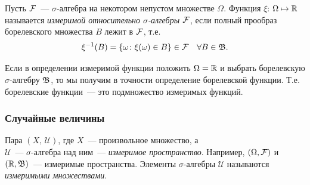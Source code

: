 \begin{defn}
    Пусть $\mathcal{F}$~--- $\sigma$-алгебра на некотором непустом множестве $\Omega$.
    Функция $\xi$: $\Omega \mapsto \mathbb{R}$ называется \textit{измеримой относительно $\sigma$-алгебры $\mathcal{F}$}, если полный прообраз борелевского множества $B$ лежит в $\mathcal{F}$, т.е. 
    \begin{equation*}
        \xi^{-1}(B) = \{\omega \colon \xi(\omega) \in B \} \in \mathcal{F} \quad \forall B \in \mathfrak{B}.
    \end{equation*}
\end{defn}

\begin{rmrk}
    Если в определении измеримой функции положить $\Omega = \mathbb{R}$ и выбрать борелевскую $\sigma$-алгебру $\mathfrak{B}$, то мы получим в точности определение борелевской функции. 
    Т.е. борелевские функции~--- это подмножество измеримых функций.
\end{rmrk}

\subsubsection{Случайные величины}
\begin{defn}
    Пара $(X,\, \mathcal{U})$, где $X$~--- произвольное множество, а \\ $\mathcal{U}$~--- $\sigma$-алгебра над ним~--- \textit{измеримое пространство}. 
    Например, $(\Omega, \mathcal{F})$ и $(\mathbb{R}, \mathfrak{B})$~--- измеримые пространства. 
    Элементы $\sigma$-алгебры $\mathcal{U}$ называются \textit{измеримыми множествами}.
\end{defn}

